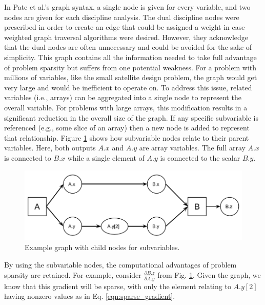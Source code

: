 \documentclass[]{aiaa-tc} %
\begin{document}
    In Pate et al.'s graph syntax, a single node is given for every variable, and two nodes are given 
    for each discipline analysis. The dual discipline nodes were prescribed in order to create an edge 
    that could be assigned a weight in case weighted graph traversal algorithms were desired. However, 
    they acknowledge that the dual nodes are often unnecessary and could be avoided for the sake of simplicity. 
    This graph contains all the information needed to take full advantage of problem sparsity but suffers from one potential
    weakness. For a problem with millions of  variables, like the small satellite design problem,
    the graph would get very large and would be inefficient to operate on. To address this issue,
    related variables (i.e., arrays) can be aggregated into a single node to represent the
    overall variable. For problems with large arrays, this modification results in a significant reduction
    in the overall size of the graph. If any specific subvariable is referenced (e.g., some slice of an array) 
    then a new node is added to represent that relationship.
    Figure \ref{fig:subvars} shows how subvariable nodes relate to their parent variables. Here,
    both outputs $A.x$ and $A.y$ are array variables. The full array $A.x$ is connected to
    $B.x$ while a single element of $A.y$ is connected to the scalar $B.y$. 

    \begin{figure}[!htb]\begin{center}
      \includegraphics[width=.8\textwidth]{images/sub-var-node-graph}
      \caption{ Example graph with child nodes for subvariables. \label{fig:subvars}}
    \end{center}\end{figure}

    By using the subvariable nodes, the computational advantages of problem sparsity are retained. For example,
    consider $\frac{\partial B.z}{\partial A.y}$ from Fig. \ref{fig:subvars}. Given the graph, we know that
    this gradient will be sparse, with only the element relating to $A.y[2]$ having nonzero values as in Eq.  \ref{eqn:sparse_gradient}.
\end{document}
